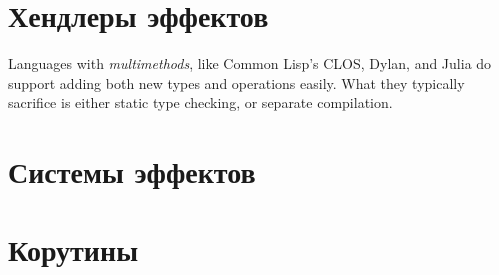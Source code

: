 \documentclass[12pt]{article}
\begin{document}









    \section{Хендлеры эффектов} \label{sec:effect-handlers}






    Languages with \textit{multimethods}, like Common Lisp’s CLOS, Dylan, and Julia do support adding both new types and operations  easily.
    What they typically sacrifice is either static type checking, or separate compilation.




    \section{Системы эффектов}



    \section{Корутины}

\end{document}
